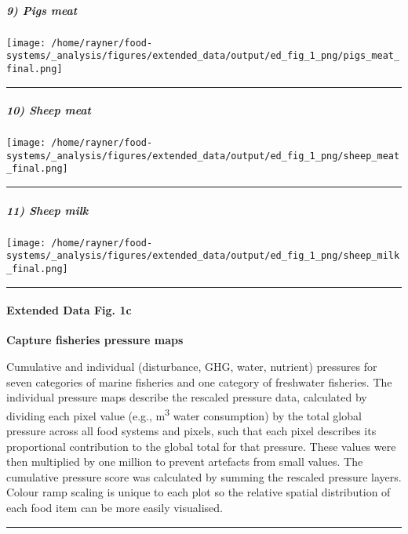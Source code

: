 \documentclass[
]{article}
\begin{document}
\hypertarget{pigs-meat}{%
\subparagraph{9) Pigs meat}\label{pigs-meat}}

\texttt{[image: /home/rayner/food-systems/\_analysis/figures/extended\_data/output/ed\_fig\_1\_png/pigs\_meat\_final.png]}

\begin{center}\rule{0.5\linewidth}{0.5pt}\end{center}

\hypertarget{sheep-meat}{%
\subparagraph{10) Sheep meat}\label{sheep-meat}}

\texttt{[image: /home/rayner/food-systems/\_analysis/figures/extended\_data/output/ed\_fig\_1\_png/sheep\_meat\_final.png]}

\begin{center}\rule{0.5\linewidth}{0.5pt}\end{center}

\hypertarget{sheep-milk}{%
\subparagraph{11) Sheep milk}\label{sheep-milk}}

\texttt{[image: /home/rayner/food-systems/\_analysis/figures/extended\_data/output/ed\_fig\_1\_png/sheep\_milk\_final.png]}

\begin{center}\rule{0.5\linewidth}{0.5pt}\end{center}

\hypertarget{extended-data-fig.-1c}{%
\paragraph{Extended Data Fig. 1c}\label{extended-data-fig.-1c}}

\textbf{Capture fisheries pressure maps}

Cumulative and individual (disturbance, GHG, water, nutrient) pressures
for seven categories of marine fisheries and one category of freshwater
fisheries. The individual pressure maps describe the rescaled pressure
data, calculated by dividing each pixel value (e.g.,
m\textsuperscript{3} water consumption) by the total global pressure
across all food systems and pixels, such that each pixel describes its
proportional contribution to the global total for that pressure. These
values were then multiplied by one million to prevent artefacts from
small values. The cumulative pressure score was calculated by summing
the rescaled pressure layers. Colour ramp scaling is unique to each plot
so the relative spatial distribution of each food item can be more
easily visualised.

\begin{center}\rule{0.5\linewidth}{0.5pt}\end{center}
\end{document}
